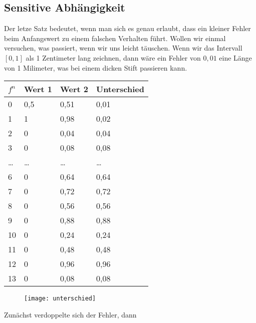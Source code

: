 \documentclass[a4paper,ngerman,12pt]{scrartcl}
\theoremstyle{definition}
\theoremstyle{plain}
\theoremstyle{remark}
\begin{document}
\subsection{Sensitive Abhängigkeit}
Der letze Satz bedeutet, wenn man sich es genau erlaubt, dass ein kleiner Fehler beim Anfangswert zu einem falschen Verhalten führt. Wollen wir einmal versuchen, was passiert, wenn wir uns leicht täuschen.
Wenn wir das Intervall $[0,1]$ als 1 Zentimeter lang zeichnen, dann wäre ein Fehler von $0,01$ eine Länge von 1 Milimeter, was bei einem dicken Stift passieren kann.
\begin{center}
\begin{tabular}{|l|l|l|l|}
\hline
$f^n$ & Wert 1 & Wert 2 & Unterschied \\ \hline
0 & 0,5 & 0,51  & 0,01 \\ \hline
1 & 1 & 0,98  & 0,02 \\ \hline
2 & 0 & 0,04  & 0,04 \\ \hline
3 & 0 & 0,08  & 0,08 \\ \hline
\ldots & \ldots & \ldots & \ldots \\ \hline
6 & 0 & 0,64  & 0,64 \\ \hline
7 & 0 & 0,72 & 0,72\\ \hline
8 & 0 & 0,56 & 0,56\\ \hline
9 & 0 & 0,88 & 0,88\\ \hline 
10 & 0 & 0,24 & 0,24\\ \hline
11 & 0 & 0,48 & 0,48\\ \hline
12 & 0 & 0,96 & 0,96\\ \hline
13 & 0 & 0,08 & 0,08\\ \hline
\end{tabular} 
\end{center}

\begin{figure}
\texttt{[image: unterschied]}
\end{figure}

Zunächst verdoppelte sich der Fehler, dann  
\end{document}
